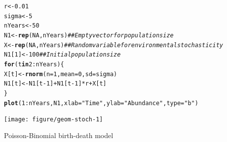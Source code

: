 \documentclass[12pt]{article}\usepackage[]{graphicx}\usepackage[]{color}
\makeatletter
\newcommand{\hlnum}[1]{\textcolor[rgb]{0.686,0.059,0.569}{#1}}%
\newcommand{\hlstr}[1]{\textcolor[rgb]{0.192,0.494,0.8}{#1}}%
\newcommand{\hlcom}[1]{\textcolor[rgb]{0.678,0.584,0.686}{\textit{#1}}}%
\newcommand{\hlopt}[1]{\textcolor[rgb]{0,0,0}{#1}}%
\newcommand{\hlstd}[1]{\textcolor[rgb]{0.345,0.345,0.345}{#1}}%
\newcommand{\hlkwa}[1]{\textcolor[rgb]{0.161,0.373,0.58}{\textbf{#1}}}%
\newcommand{\hlkwb}[1]{\textcolor[rgb]{0.69,0.353,0.396}{#1}}%
\newcommand{\hlkwc}[1]{\textcolor[rgb]{0.333,0.667,0.333}{#1}}%
\newcommand{\hlkwd}[1]{\textcolor[rgb]{0.737,0.353,0.396}{\textbf{#1}}}%
\newenvironment{kframe}{%
 \def\at@end@of@kframe{}%
 \ifinner\ifhmode%
  \def\at@end@of@kframe{\end{minipage}}%
  \begin{minipage}{\columnwidth}%
 \fi\fi%
 \def\FrameCommand##1{\hskip\@totalleftmargin \hskip-\fboxsep
 \colorbox{shadecolor}{##1}\hskip-\fboxsep
     \hskip-\linewidth \hskip-\@totalleftmargin \hskip\columnwidth}%
 \MakeFramed {\advance\hsize-\width
   \@totalleftmargin\z@ \linewidth\hsize
   \@setminipage}}%
 {\par\unskip\endMakeFramed%
 \at@end@of@kframe}
\newenvironment{knitrout}{}{} %
\makeatother
\begin{document}
\begin{knitrout}
\color{fgcolor}\begin{kframe}
\begin{alltt}
\hlstd{r} \hlkwb{<-} \hlnum{0.01}
\hlstd{sigma} \hlkwb{<-} \hlnum{5}
\hlstd{nYears} \hlkwb{<-} \hlnum{50}
\hlstd{N1} \hlkwb{<-} \hlkwd{rep}\hlstd{(}\hlnum{NA}\hlstd{, nYears)}  \hlcom{## Empty vector for population size }
\hlstd{X} \hlkwb{<-} \hlkwd{rep}\hlstd{(}\hlnum{NA}\hlstd{, nYears)}   \hlcom{## Random variable for environmental stochasticity}
\hlstd{N1[}\hlnum{1}\hlstd{]} \hlkwb{<-} \hlnum{100}           \hlcom{## Initial population size}
\hlkwa{for}\hlstd{(t} \hlkwa{in} \hlnum{2}\hlopt{:}\hlstd{nYears) \{}
    \hlstd{X[t]} \hlkwb{<-} \hlkwd{rnorm}\hlstd{(}\hlkwc{n}\hlstd{=}\hlnum{1}\hlstd{,} \hlkwc{mean}\hlstd{=}\hlnum{0}\hlstd{,} \hlkwc{sd}\hlstd{=sigma)}
    \hlstd{N1[t]} \hlkwb{<-} \hlstd{N1[t}\hlopt{-}\hlnum{1}\hlstd{]} \hlopt{+} \hlstd{N1[t}\hlopt{-}\hlnum{1}\hlstd{]}\hlopt{*}\hlstd{r} \hlopt{+} \hlstd{X[t]}
\hlstd{\}}
\hlkwd{plot}\hlstd{(}\hlnum{1}\hlopt{:}\hlstd{nYears, N1,} \hlkwc{xlab}\hlstd{=}\hlstr{"Time"}\hlstd{,} \hlkwc{ylab}\hlstd{=}\hlstr{"Abundance"}\hlstd{,} \hlkwc{type}\hlstd{=}\hlstr{"b"}\hlstd{)}
\end{alltt}
\end{kframe}

{\centering \texttt{[image: figure/geom-stoch-1]} 

}



\end{knitrout}


\newpage

Poisson-Binomial birth-death model
\end{document}
